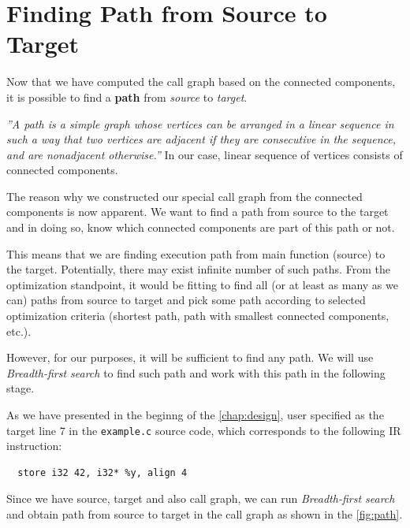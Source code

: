 \documentclass[12pt, twoside]{fithesis2}
\renewcommand{\_}{\leavevmode \kern0.07em\vbox{\hrule width0.4em}}
\begin{document}
\section{Finding Path from Source to Target}
\label{sec:design-path}

Now that we have computed the call graph based on the connected components, it
is possible to find a \textbf{path} from \emph{source} to \emph{target}.

\emph{''A path is a simple graph whose vertices can be arranged in a linear sequence in
such a way that two vertices are adjacent if they are consecutive in the sequence,
and are nonadjacent otherwise.''}\cite{graph_theory} In our case, linear
sequence of vertices consists of connected components.

The reason why we constructed our special call graph from the connected
components is now apparent. We want to find a path from source to the target and
in doing so, know which connected components are part of this path or not.

This means that we are finding execution path from main function (source) to the
target.
Potentially, there may exist infinite number of such paths. From
the optimization standpoint, it would be fitting to find all (or at least as
many as we can) paths from source to target and pick some path according to
selected optimization criteria (shortest path, path with smallest connected
components, etc.).

However, for our purposes, it will be sufficient to find any path. We will use
\emph{Breadth-first search} to find such path and work with this path in the
following stage.

As we have presented in the beginng of the \autoref{chap:design}, user specified
as the target line 7 in the \texttt{example.c} source code, which
corresponds to the following IR instruction:

\begin{verbatim}
  store i32 42, i32* %y, align 4
\end{verbatim}

Since we have source, target and also call graph, we can run
\emph{Breadth-first search} and obtain path from source to target in the call
graph as shown in the \autoref{fig:path}.
\end{document}
